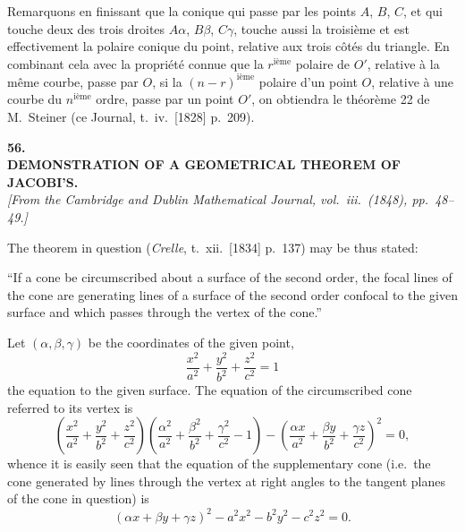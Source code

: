 \documentclass[11pt]{article}
\begin{document}
\medskip
Remarquons en finissant que la conique qui passe par les points $A$, $B$, $C$, et qui
touche deux des trois droites $A\alpha$, $B\beta$, $C\gamma$, touche aussi la troisi\`eme et est effectivement
la polaire conique du point, relative aux trois c\^ot\'es du triangle. En combinant cela avec
la propri\'et\'e connue que la $r^{\text{i\`eme}}$ polaire de $O'$, relative \`a la m\^eme courbe, passe par $O$, si
la $(n - r)^{\text{i\`eme}}$ polaire d'un point $O$, relative \`a une courbe du $n^{\text{i\`eme}}$ ordre, passe par un point
$O'$, on obtiendra le th\'eor\`eme 22 de M.~Steiner (ce Journal, t.~iv.\ [1828] p.~209).

\bigskip

\begin{center}
\textbf{\large 56.}\\[0.7em]
\textbf{\large DEMONSTRATION OF A GEOMETRICAL THEOREM OF JACOBI'S.}\\[0.5em]
\textit{[From the Cambridge and Dublin Mathematical Journal, vol.~iii.\ (1848), pp.~48--49.]}
\end{center}

\medskip

\noindent The theorem in question (\emph{Crelle}, t.~xii.\ [1834] p.~137) may be thus stated:

\smallskip
``If a cone be circumscribed about a surface of the second order, the focal lines
of the cone are generating lines of a surface of the second order confocal to the given
surface and which passes through the vertex of the cone.''

\smallskip
Let $(\alpha, \beta, \gamma)$ be the coordinates of the given point,
\[
\frac{x^{2}}{a^{2}} + \frac{y^{2}}{b^{2}} + \frac{z^{2}}{c^{2}} = 1
\]
the equation to the given surface. The equation of the circumscribed cone referred to
its vertex is
\[
\left(\frac{x^{2}}{a^{2}} + \frac{y^{2}}{b^{2}} + \frac{z^{2}}{c^{2}}\right)\left(\frac{\alpha^{2}}{a^{2}} + \frac{\beta^{2}}{b^{2}} + \frac{\gamma^{2}}{c^{2}} - 1\right) - \left(\frac{\alpha x}{a^{2}} + \frac{\beta y}{b^{2}} + \frac{\gamma z}{c^{2}}\right)^{2} = 0,
\]
whence it is easily seen that the equation of the supplementary cone (i.e.\ the cone
generated by lines through the vertex at right angles to the tangent planes of the
cone in question) is
\[
(\alpha x + \beta y + \gamma z)^{2} - a^{2} x^{2} - b^{2} y^{2} - c^{2} z^{2} = 0. \tag{$*$}
\]
\end{document}
